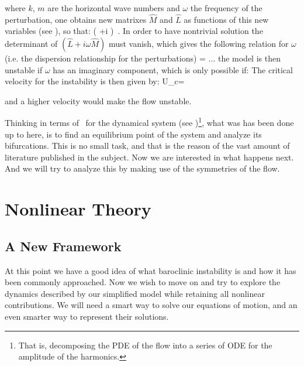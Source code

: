 where $k$, $m$ are the horizontal wave numbers and $\omega$ the frequency
of the perturbation, one obtains new matrixes $\hat{M}$ and $\hat{L}$ as
functions of this new variables (see ), so that:
\beq
\left( +i \omega {}\right) 
\,.
In order to have nontrivial solution the determinant of $\left( \hat{L}+i
\omega \hat{M}\right)$ must vanish, which gives the following relation
for $\omega$ (i.e. the dispersion relationship for the
perturbations)
\beq
\omega = ...%
the model is then unstable if $\omega$ has an imaginary component, which is only possible if:
\beq
The critical velocity for the instability is then given by:
\beq
U_c=%

and a higher velocity would make the flow unstable.

Thinking in terms of \statesp\ for the dynamical system (see
)\footnote{
    That is, decomposing the PDE of the flow into
    a series of ODE for the amplitude of the harmonics.
}, what was has been done up to here, is to find an equilibrium point of
the system and analyze its bifurcations. This is no small task, and that
is the reason of the vast amount of literature published in the subject.
Now we are interested in what happens next. And we will try to analyze
this by making use of the symmetries of the flow.

\section{Nonlinear Theory}
\label{s:nonlinear}
\subsection{A New Framework}
At this point we have a good idea of what baroclinic instability is and how it has been commonly approached. Now we wish to move on and try to explore the dynamics described by our simplified model while retaining all nonlinear contributions.
We will need a smart way to solve our equations of motion, and an even smarter way to represent their solutions.

